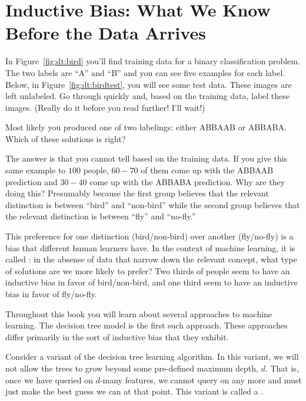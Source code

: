 \section{Inductive Bias: What We Know Before the Data Arrives}



In Figure~\ref{fig:dt:bird} you'll find training data for a binary
classification problem.  The two labels are ``A'' and ``B'' and you
can see five examples for each label.  Below, in
Figure~\ref{fig:dt:birdtest}, you will see some test data.  These
images are left unlabeled.  Go through quickly and, based on the
training data, label these images.  (Really do it before you read
further!  I'll wait!)

Most likely you produced one of two labelings: either ABBAAB or
ABBABA.  Which of these solutions is right?

The answer is that you cannot tell based on the training data.  If you
give this same example to $100$ people, $60-70$ of them come up with
the ABBAAB prediction and $30-40$ come up with the ABBABA prediction.
Why are they doing this?  Presumably because the first group believes
that the relevant distinction is between ``bird'' and ``non-bird''
while the second group believes that the relevant distinction is
between ``fly'' and ``no-fly.''

This preference for one distinction (bird/non-bird) over another
(fly/no-fly) is a bias that different human learners have.  In the
context of machine learning, it is called : in
the absense of data that narrow down the relevant concept, what type
of solutions are we more likely to prefer?  Two thirds of people seem
to have an inductive bias in favor of bird/non-bird, and one third
seem to have an inductive bias in favor of fly/no-fly.


Throughout this book you will learn about several approaches to
machine learning.  The decision tree model is the first such
approach.  These approaches differ primarily in the sort of inductive
bias that they exhibit.

Consider a variant of the decision tree learning algorithm.  In this
variant, we will not allow the trees to grow beyond some pre-defined
maximum depth, $d$.  That is, once we have queried on $d$-many
features, we cannot query on any more and must just make the best
guess we can at that point.  This variant is called a .

